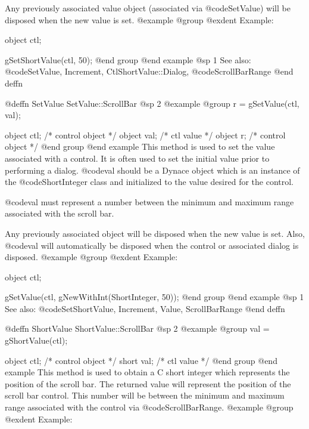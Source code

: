 Any previously associated value object (associated via @code{SetValue})
will be disposed when the new value is set.
@example
@group
@exdent Example:

object  ctl;

gSetShortValue(ctl, 50);
@end group
@end example
@sp 1
See also:  @code{SetValue, Increment, CtlShortValue::Dialog,}
        @code{ScrollBarRange}
@end deffn













@deffn {SetValue} SetValue::ScrollBar
@sp 2
@example
@group
r = gSetValue(ctl, val);

object  ctl;    /*  control object  */
object  val;    /*  ctl value       */
object  r;      /*  control object  */
@end group
@end example
This method is used to set the value associated with a control.  It is
often used to set the initial value prior to performing a dialog.
@code{val} should be a Dynace object which is an instance of the
@code{ShortInteger} class and initialized to the value desired for the
control.

@code{val} must represent a number between the minimum and maximum range
associated with the scroll bar.

Any previously associated object will be disposed when the new value is set.
Also, @code{val} will automatically be disposed when the control or associated
dialog is disposed.
@example
@group
@exdent Example:

object  ctl;

gSetValue(ctl, gNewWithInt(ShortInteger, 50));
@end group
@end example
@sp 1
See also:  @code{SetShortValue, Increment, Value, ScrollBarRange}
@end deffn













@deffn {ShortValue} ShortValue::ScrollBar
@sp 2
@example
@group
val = gShortValue(ctl);

object  ctl;   /*  control object  */
short   val;   /*  ctl value       */
@end group
@end example
This method is used to obtain a C short integer which represents the
position of the scroll bar.  The returned value will represent the
position of the scroll bar control.  This number will be between the
minimum and maximum range associated with the control via
@code{ScrollBarRange}.
@example
@group
@exdent Example:

